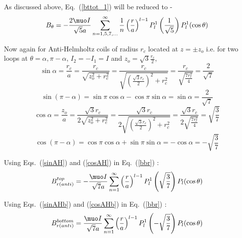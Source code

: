 As discussed above, Eq.~(\ref{bttot_1}) will be reduced to -
\begin{equation}\label{brtotf}
B_\theta=-\frac{2 \muo I }{\sqrt{5}a}\sum_{n=1,5,7,...}^{\infty}
\frac{1}{n}\left(\frac{r}{a}\right)^{l-1}P_l^1\left(\frac{1}{\sqrt{5}}\right) P_l^1(\cos\theta)
\end{equation}



Now again for Anti-Helmholtz coils of radius \(r_c\) located at \(z=\pm z_o\) i.e. for two loops at \(\theta=\alpha, \pi-\alpha \), \(I_2=-I_1=I\) and \(z_o=\sqrt{3}\frac{r_c}{2}\),
\begin{equation}\label{sinAH}
\sin\alpha=\frac{r_c}{a}=\frac{r_c}{\sqrt{z_o^2+r_c^2}}=\frac{r_c}{\sqrt{\left(\frac{\sqrt{3}r_c}{2}\right)^2+r_c^2}}=\frac{r_c}{\sqrt{\frac{7r_c^2}{4}}}=\frac{2}{\sqrt{7}}
\end{equation}
\begin{equation}\label{sinAHb}
\sin(\pi-\alpha)=\sin\pi\cos\alpha-\cos\pi\sin\alpha=\sin\alpha=\frac{2}{\sqrt{7}}
\end{equation}
\begin{equation}\label{cosAH}
\cos\alpha=\frac{z_o}{a}=\frac{\sqrt{3}r_c}{2\sqrt{z_o^2+r_c^2}}=\frac{\sqrt{3}r_c}{2\sqrt{\left(\frac{\sqrt{3}r_c}{2}\right)^2+r_c^2}}=\frac{\sqrt{3}r_c}{2\sqrt{\frac{7r_c^2}{4}}}=\sqrt{\frac{3}{7}}
\end{equation}
\begin{equation}\label{cosAHb}
\cos(\pi-\alpha)=\cos\pi\cos\alpha+\sin\pi\sin\alpha=-\cos\alpha=-\sqrt{\frac{3}{7}}
\end{equation}

Using Eqs.~(\ref{sinAH}) and (\ref{cosAH}) in Eq.~(\ref{bbr}) :
\begin{equation}\label{bbrAH}
B_{r(anti)}^{top}=-\frac{\muo I }{\sqrt{7}a}\sum_{n=1}^{\infty} \left(\frac{r}{a}\right)^{l-1}P_l^1\left(\sqrt{\frac{3}{7}}\right) P_l(\cos\theta)
\end{equation}

Using Eqs.~(\ref{sinAHb}) and (\ref{cosAHb}) in Eq.~(\ref{bbr}) :
\begin{equation}\label{bbrAHb}
B_{r(anti)}^{bottom}=\frac{\muo I }{\sqrt{7}a}\sum_{n=1}^{\infty} \left(\frac{r}{a}\right)^{l-1}P_l^1\left(-\sqrt{\frac{3}{7}}\right) P_l(\cos\theta)
\end{equation}


